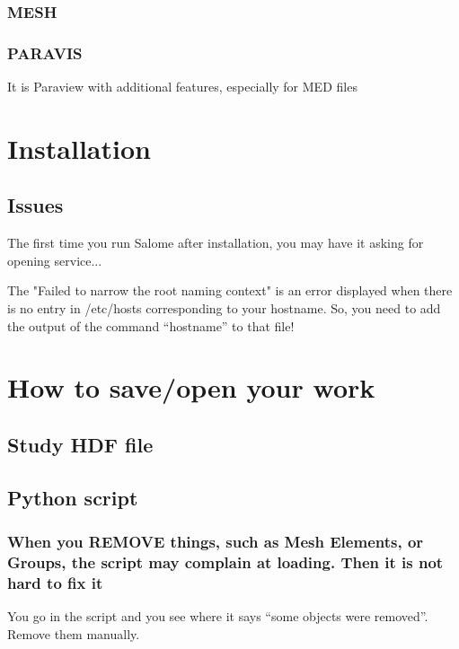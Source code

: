 \documentclass[10pt]{book}
\begin{document}
 \subsection{MESH}

 
  \subsection{PARAVIS}
  
  
  It is Paraview with additional features, especially for MED files

  
  
\chapter{Installation}

\section{Issues}

  The first time you run Salome after installation,
  you may have it asking for opening service...

The "Failed to narrow the root naming context" 
is an error displayed when there is no entry in /etc/hosts 
corresponding to your hostname. So, you need to add the output of the command
 ``hostname'' to that file!

\chapter{How to save/open your work}

  \section{Study HDF file}

  
  \section{Python script}

  
    \subsection{When you REMOVE things, such as Mesh Elements, or Groups, the script may complain at loading. Then it is not hard to fix it}
    
    
    You go in the script and you see where it says ``some objects were removed''.
    Remove them manually.
  
\end{document}
